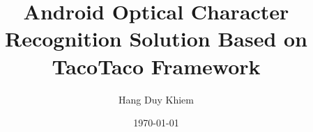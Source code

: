 
\def\thesislang{english} %

\author{Hang Duy Khiem} %
\def\thesis{Thesis}%

\def\alaotsikko{} %

\title{Android Optical Character Recognition Solution Based on TacoTaco Framework}
\def\metropoliadegree {Bachelor of Engineering} %
\def\metropoliadegreeprogramme {Information Technology}
\def\metropoliaspecialisation {Software Engineering}
\def\metropoliainstructors {
Patrick Ausderau, Principal Lecturer
}
\def\metropoliakeywords {android, ocr, tacotaco, framework, }
\date{\longmonth\today}


